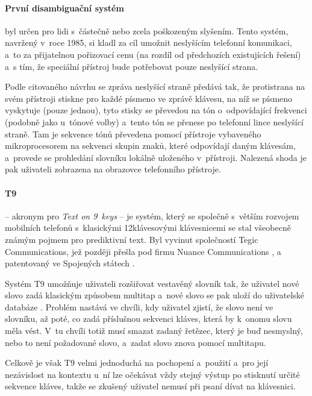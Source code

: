 \documentclass[a4paper,11pt,openany]{book} %
\begin{document}
\paragraph{První disambiguační systém} byl určen pro lidi s~částečně nebo zcela poškozeným slyšením. Tento systém, navržený v~roce 1985, si kladl za cíl umožnit neslyšícím telefonní komunikaci, a~to za přijatelnou pořizovací cenu (na rozdíl od předchozích existujících řešení) a~s tím, že speciální přístroj bude potřebovat pouze neslyšící strana. \parencite{feinson1988interpretive}

Podle citovaného návrhu se zpráva neslyšící straně předává tak, že protistrana na svém přístroji stiskne pro každé písmeno ve zprávě klávesu, na níž se písmeno vyskytuje (pouze jednou), tyto stisky se převedou na tón o~odpovídající frekvenci (podobně jako u~tónové volby) a~tento tón se přenese po telefonní lince neslyšící straně. Tam je sekvence tónů převedena pomocí přístroje vybaveného mikroprocesorem na sekvenci skupin znaků, které odpovídají daným klávesám, a~provede se prohledání slovníku lokálně uloženého v~přístroji. Nalezená shoda je pak uživateli zobrazena na obrazovce telefonního přístroje.

\paragraph{T9}\label{t9}
 -- akronym pro {\it Text on 9~keys} -- je systém, který se společně s~větším rozvojem mobilních telefonů s~klasickými 12klávesovými klávesnicemi se stal všeobecně známým pojmem pro prediktivní text. Byl vyvinut společností Tegic Communications, jež později přešla pod firmu Nuance Communications \parencite{nuancecommunications2007}, a patentovaný ve Spojených státech \parencite{grover1998reduced}. 

Systém T9 umožňuje uživateli rozšiřovat vestavěný slovník tak, že uživatel nové slovo zadá klasickým způsobem multitap a~nové slovo se pak uloží do uživatelské databáze \parencite{t9about}. %
Problém nastává ve chvíli, kdy uživatel zjistí, že slovo není ve slovníku, až poté, co zadá příslušnou sekvenci kláves, která by k~onomu slovu měla vést. V~tu chvíli totiž musí smazat zadaný řetězec, který je buď nesmyslný, nebo to není požadované slovo, a~zadat slovo znova pomocí multitapu.

Celkově je však T9 velmi jednoduchá na pochopení a~použití a~pro její nezávislost na kontextu u~ní lze očekávat vždy stejný výstup po stisknutí určité sekvence kláves, takže se zkušený uživatel nemusí při psaní dívat na klávesnici. \parencite{davidmackay}
\end{document}
